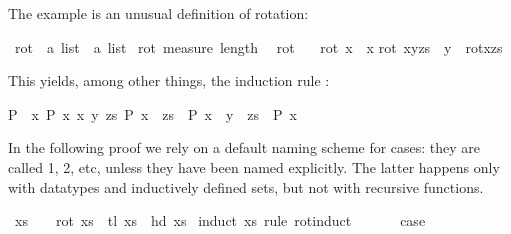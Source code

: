\begin{isabellebody}
\begin{isamarkuptext}
The example is an unusual definition of rotation:%
\end{isamarkuptext}%
\isamarkupfalse%
\ rot\ {\isacharcolon}{\isacharcolon}\ {\isachardoublequote}{\isacharprime}a\ list\ {\isasymRightarrow}\ {\isacharprime}a\ list{\isachardoublequote}\isanewline
\isamarkupfalse%
\ rot\ {\isachardoublequote}measure\ length{\isachardoublequote}\ \ %
\isanewline
{\isachardoublequote}rot\ {\isacharbrackleft}{\isacharbrackright}\ {\isacharequal}\ {\isacharbrackleft}{\isacharbrackright}{\isachardoublequote}\isanewline
{\isachardoublequote}rot\ {\isacharbrackleft}x{\isacharbrackright}\ {\isacharequal}\ {\isacharbrackleft}x{\isacharbrackright}{\isachardoublequote}\isanewline
{\isachardoublequote}rot\ {\isacharparenleft}x{\isacharhash}y{\isacharhash}zs{\isacharparenright}\ {\isacharequal}\ y\ {\isacharhash}\ rot{\isacharparenleft}x{\isacharhash}zs{\isacharparenright}{\isachardoublequote}\isamarkuptrue%
%
\begin{isamarkuptext}%
\noindent This yields, among other things, the induction rule
: \begin{isabelle}%
{\isasymlbrakk}P\ {\isacharbrackleft}{\isacharbrackright}{\isacharsemicolon}\ {\isasymAnd}x{\isachardot}\ P\ {\isacharbrackleft}x{\isacharbrackright}{\isacharsemicolon}\ {\isasymAnd}x\ y\ zs{\isachardot}\ P\ {\isacharparenleft}x\ {\isacharhash}\ zs{\isacharparenright}\ {\isasymLongrightarrow}\ P\ {\isacharparenleft}x\ {\isacharhash}\ y\ {\isacharhash}\ zs{\isacharparenright}{\isasymrbrakk}\ {\isasymLongrightarrow}\ P\ x%
\end{isabelle}
In the following proof we rely on a default naming scheme for cases: they are
called 1, 2, etc, unless they have been named explicitly. The latter happens
only with datatypes and inductively defined sets, but not with recursive
functions.%
\end{isamarkuptext}%
\isamarkupfalse%
\ {\isachardoublequote}xs\ {\isasymnoteq}\ {\isacharbrackleft}{\isacharbrackright}\ {\isasymLongrightarrow}\ rot\ xs\ {\isacharequal}\ tl\ xs\ {\isacharat}\ {\isacharbrackleft}hd\ xs{\isacharbrackright}{\isachardoublequote}\isanewline
%
\isadelimproof
%
\endisadelimproof
%
\isatagproof
\isamarkupfalse%
\ {\isacharparenleft}induct\ xs\ rule{\isacharcolon}\ rot{\isachardot}induct{\isacharparenright}\isanewline
\ \ \isamarkupfalse%
\ {}\ \isamarkupfalse%
\ {\isacharquery}case\ \isamarkupfalse%

\end{isabellebody}
